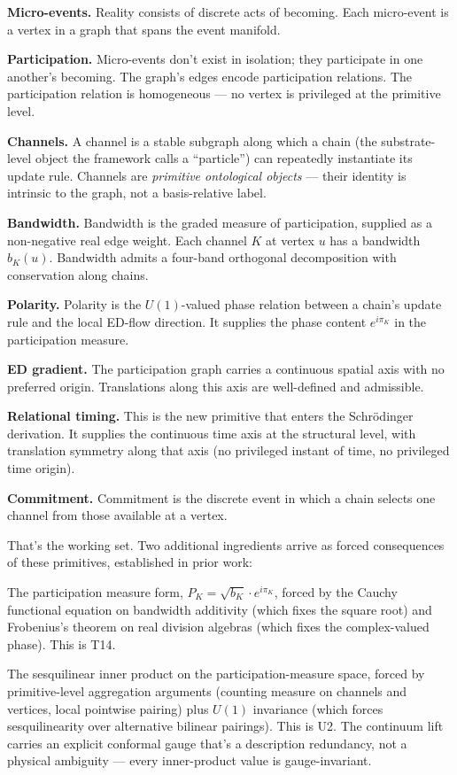 \documentclass[11pt,a4paper]{article}
\begin{document}
\textbf{Micro-events.} Reality consists of discrete acts of becoming. Each micro-event is a vertex in a graph that spans the event manifold.

\textbf{Participation.} Micro-events don't exist in isolation; they participate in one another's becoming. The graph's edges encode participation relations. The participation relation is homogeneous --- no vertex is privileged at the primitive level.

\textbf{Channels.} A channel is a stable subgraph along which a chain (the substrate-level object the framework calls a ``particle'') can repeatedly instantiate its update rule. Channels are \emph{primitive ontological objects} --- their identity is intrinsic to the graph, not a basis-relative label.

\textbf{Bandwidth.} Bandwidth is the graded measure of participation, supplied as a non-negative real edge weight. Each channel $K$ at vertex $u$ has a bandwidth $b_K(u)$. Bandwidth admits a four-band orthogonal decomposition with conservation along chains.

\textbf{Polarity.} Polarity is the $U(1)$-valued phase relation between a chain's update rule and the local ED-flow direction. It supplies the phase content $e^{i\pi_K}$ in the participation measure.

\textbf{ED gradient.} The participation graph carries a continuous spatial axis with no preferred origin. Translations along this axis are well-defined and admissible.

\textbf{Relational timing.} This is the new primitive that enters the Schr\"odinger derivation. It supplies the continuous time axis at the structural level, with translation symmetry along that axis (no privileged instant of time, no privileged time origin).

\textbf{Commitment.} Commitment is the discrete event in which a chain selects one channel from those available at a vertex.

That's the working set. Two additional ingredients arrive as forced consequences of these primitives, established in prior work:

The participation measure form, $P_K = \sqrt{b_K} \cdot e^{i\pi_K}$, forced by the Cauchy functional equation on bandwidth additivity (which fixes the square root) and Frobenius's theorem on real division algebras (which fixes the complex-valued phase). This is T14.

The sesquilinear inner product on the participation-measure space, forced by primitive-level aggregation arguments (counting measure on channels and vertices, local pointwise pairing) plus $U(1)$ invariance (which forces sesquilinearity over alternative bilinear pairings). This is U2. The continuum lift carries an explicit conformal gauge that's a description redundancy, not a physical ambiguity --- every inner-product value is gauge-invariant.
\end{document}
